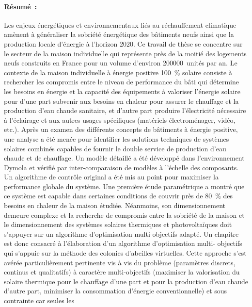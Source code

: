 
\footnotesize
\paragraph{Résumé~:}
Les enjeux énergétiques et environnementaux liés au réchauffement climatique amènent à
généraliser la sobriété énergétique des bâtiments neufs ainsi que la production locale
d’énergie à l’horizon $2020$. Ce travail de thèse se concentre sur le secteur de la maison
individuelle qui représente près de la moitié des logements neufs construits en France
pour un volume d’environ \si{200000}~unités par an.
Le contexte de la maison individuelle à énergie positive \SI{100}{\percent} solaire consiste à
rechercher les compromis entre le niveau de performance du bâti qui détermine les besoins
en énergie et la capacité des équipements à valoriser l’énergie solaire pour d’une part
subvenir aux besoins en chaleur pour assurer le chauffage et la production d’eau chaude
sanitaire, et d’autre part produire l’électricité nécessaire à l’éclairage et aux autres
usages spécifiques (matériels électroménager, vidéo, etc.).
Après un examen des différents concepts de bâtiments à énergie positive, une analyse a été
menée pour identifier les solutions techniques de systèmes solaires combinés capables de
fournir le double service de production d’eau chaude et de chauffage. Un modèle détaillé a
été développé dans l’environnement Dymola et vérifié par inter-comparaison de modèles à
l’échelle des composants. Un algorithme de contrôle original a été mis au point pour
maximiser la performance globale du système. Une première étude paramétrique a montré que
ce système est capable dans certaines conditions de couvrir près de \SI{80}{\percent} des besoins en
chaleur de la maison étudiée. Néanmoins, son dimensionnement demeure complexe et la
recherche de compromis entre la sobriété de la maison et le dimensionnement des systèmes
solaires thermiques et photovoltaïques doit s’appuyer sur un algorithme d’optimisation
multi-objectifs adapté.
Un chapitre est donc consacré à l’élaboration d’un algorithme d’optimisation multi-
objectifs qui s’appuie sur la méthode des colonies d’abeilles virtuelles. Cette approche
s’est avérée particulièrement pertinente vis à vis du problème (paramètres discrets,
continus et qualitatifs) à caractère multi-objectifs (maximiser la valorisation du solaire
thermique pour le chauffage d’une part et pour la production d’eau chaude d’autre part,
minimiser la consommation d’énergie conventionnelle) et sous contrainte car seules les
